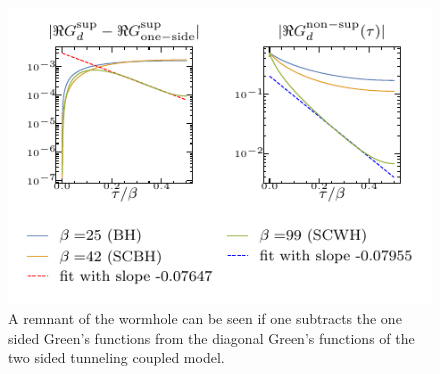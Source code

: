 \begin{figure}[t]
    \centering
    \includegraphics[width=0.75\linewidth]{figures/chapter3/diffG.pdf} %
    \caption{A remnant of the wormhole can be seen if one subtracts the one sided Green's functions from the diagonal Green's functions of the two sided tunneling coupled model.}
    \label{fig:subleading-Sc}
\end{figure}

